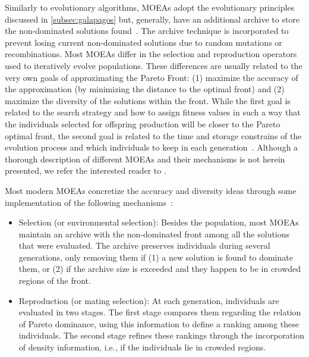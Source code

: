 	Similarly to evolutionary algorithms, \acp{MOEA} adopt the evolutionary principles discussed in \cref{subsec:galapagos} but, generally, have an additional archive to store the non-dominated solutions found~\cite{Zitzler2001SPEA2}. The archive technique is incorporated to prevent losing current non-dominated solutions due to random mutations or recombinations. Most \acp{MOEA} differ in the selection and reproduction operators used to iteratively evolve populations. These differences are usually related to the very own goals of approximating the Pareto Front: (1) maximize the accuracy of the approximation (by minimizing the distance to the optimal front) and (2) maximize the diversity of the solutions within the front. While the first goal is related to the search strategy and how to assign fitness values in such a way that the individuals selected for offspring production will be closer to the Pareto optimal front, the second goal is related to the time and storage constrains of the evolution process and which individuals to keep in each generation~\cite{Zitzler2001SPEA2}. Although a thorough description of different \acp{MOEA} and their mechanisms is not herein presented, we refer the interested reader to \cite{Zhou2011}. 
	
	Most modern \acp{MOEA} concretize the accuracy and diversity ideas through some implementation of the following mechanisms~\cite{Zitzler2001SPEA2}:	
	\begin{itemize}
	\item Selection (or environmental selection): Besides the population, most \acp{MOEA} maintain an archive with the non-dominated front among all the solutions that were evaluated. The archive preserves individuals during several generations, only removing them if (1) a new solution is found to dominate them, or (2) if the archive size is exceeded and they happen to be in crowded regions of the front.

	\item Reproduction (or mating selection): At each generation, individuals are evaluated in two stages. The first stage compares them regarding the relation of Pareto dominance, using this information to define a ranking among these individuals. The second stage refines these rankings through the incorporation of density information, i.e., if the individuals lie in crowded regions.
	\end{itemize}

